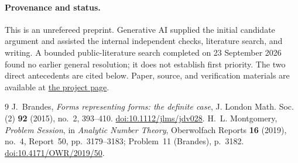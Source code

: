 \documentclass[11pt]{article}
\begin{document}
\paragraph{Provenance and status.}
This is an unrefereed preprint. Generative AI supplied the initial candidate
argument and assisted the internal independent checks, literature search,
and writing. A bounded public-literature search completed on 23 September
2026 found no earlier general resolution; it does not establish first
priority. The two direct antecedents are cited below.
Paper, source, and verification materials are available at
\href{https://aleckriebel.github.io/Math/papers/brandes-coefficient-normalization/}{the project page}.

\begin{thebibliography}{9}
J.~Brandes, \emph{Forms representing forms: the definite case},
J. London Math. Soc. (2) \textbf{92} (2015), no.~2, 393--410.
\href{https://doi.org/10.1112/jlms/jdv028}{doi:10.1112/jlms/jdv028}.
H.~L. Montgomery, \emph{Problem Session}, in \emph{Analytic Number Theory},
Oberwolfach Reports \textbf{16} (2019), no.~4, Report~50, pp.~3179--3183;
Problem~11 (Brandes), p.~3182.
\href{https://doi.org/10.4171/OWR/2019/50}{doi:10.4171/OWR/2019/50}.
\end{thebibliography}
\end{document}
